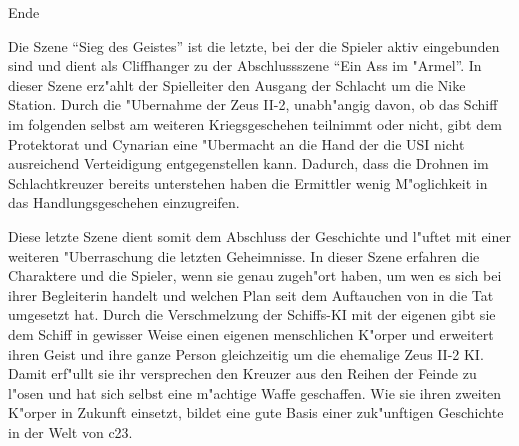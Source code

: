 \begin{remarks}
	\begin{center}\huge{}Ende\end{center}

	Die Szene "`Sieg des Geistes"' ist die letzte, bei der die Spieler aktiv eingebunden sind und dient als Cliffhanger zu der Abschlussszene "`Ein Ass im "Armel"'. In dieser Szene erz"ahlt der Spielleiter den Ausgang der Schlacht um die Nike Station.    
    Durch die "Ubernahme der Zeus II-2, unabh"angig davon, ob das Schiff im folgenden selbst am weiteren Kriegsgeschehen teilnimmt oder nicht, gibt dem Protektorat und Cynarian eine "Ubermacht an die Hand der die USI nicht ausreichend Verteidigung entgegenstellen kann. Dadurch, dass die Drohnen im Schlachtkreuzer bereits \xl{} unterstehen haben die Ermittler wenig M"oglichkeit in das Handlungsgeschehen einzugreifen.

	Diese letzte Szene dient somit dem Abschluss der Geschichte und l"uftet mit einer weiteren "Uberraschung die letzten Geheimnisse. In dieser Szene erfahren die Charaktere und die Spieler, wenn sie genau zugeh"ort haben, um wen es sich bei ihrer Begleiterin handelt und welchen Plan \xl{} seit dem Auftauchen von \ml{} in die Tat umgesetzt hat. Durch die Verschmelzung der Schiffs-KI mit der eigenen gibt sie dem Schiff in gewisser Weise einen eigenen menschlichen K"orper und erweitert ihren Geist und ihre ganze Person gleichzeitig um die ehemalige Zeus II-2 KI. Damit erf"ullt sie ihr versprechen den Kreuzer aus den Reihen der Feinde zu l"osen und hat sich selbst eine m"achtige Waffe geschaffen. Wie sie ihren zweiten K"orper in Zukunft einsetzt, bildet eine gute Basis einer zuk"unftigen Geschichte in der Welt von c23.
\end{remarks}
\pagebreak